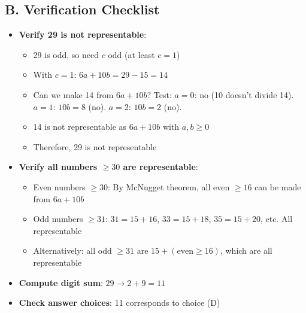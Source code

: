 \documentclass[12pt]{article}
\begin{document}
\begin{verificationbox}
\subsection*{B. Verification Checklist}
\begin{itemize}[leftmargin=*]
    \item \textbf{Verify 29 is not representable}:
    \begin{itemize}
        \item 29 is odd, so need $c$ odd (at least $c = 1$)
        \item With $c = 1$: $6a + 10b = 29 - 15 = 14$
        \item Can we make 14 from $6a + 10b$? Test: $a = 0$: no (10 doesn't divide 14). $a = 1$: $10b = 8$ (no). $a = 2$: $10b = 2$ (no).
        \item 14 is not representable as $6a + 10b$ with $a, b \geq 0$
        \item Therefore, 29 is not representable
    \end{itemize}
    \item \textbf{Verify all numbers $\geq 30$ are representable}:
    \begin{itemize}
        \item Even numbers $\geq 30$: By McNugget theorem, all even $\geq 16$ can be made from $6a + 10b$
        \item Odd numbers $\geq 31$: $31 = 15 + 16$, $33 = 15 + 18$, $35 = 15 + 20$, etc. All representable
        \item Alternatively: all odd $\geq 31$ are $15 + (\text{even} \geq 16)$, which are all representable
    \end{itemize}
    \item \textbf{Compute digit sum}: $29 \to 2 + 9 = 11$
    \item \textbf{Check answer choices}: 11 corresponds to choice (D)
\end{itemize}


\end{verificationbox}
\end{document}
